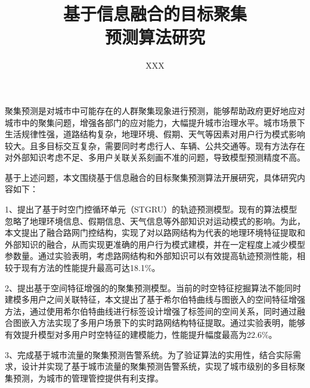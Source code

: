 \documentclass[master]{thesis-uestc}
\title{基于信息融合的目标聚集\\预测算法研究}{Research on Target Gather Prediction Algorithm based on Information Fusion}
\author{XXX}{XXX}
\begin{document}
\makecover
\originalitydeclaration
\begin{chineseabstract}
聚集预测是对城市中可能存在的人群聚集现象进行预测，能够帮助政府更好地应对城市中的聚集问题，增强各部门的应对能力，大幅提升城市治理水平。城市场景下生活规律性强，道路结构复杂，地理环境、假期、天气等因素对用户行为模式影响较大。且多目标交互复杂，需要同时考虑行人、车辆、公共交通等。现有方法存在对外部知识考虑不足、多用户关联关系刻画不准的问题，导致模型预测精度不高。

基于上述问题，本文围绕基于信息融合的目标聚集预测算法开展研究，具体研究内容如下：

1、提出了基于时空门控循环单元（STGRU）的轨迹预测模型。现有的算法模型忽略了地理环境信息、假期信息、天气信息等外部知识对运动模式的影响。为此，本文提出了融合路网门控结构，实现了对以路网结构为代表的地理环境特征提取和外部知识的融合，从而实现更准确的用户行为模式建模，并在一定程度上减少模型参数量。通过实验表明，考虑路网结构和外部知识可以有效提高轨迹预测性能，相较于现有方法的性能提升最高可达18.1$\%$。

2、提出基于空间特征增强的的聚集预测模型。当前的时空特征挖掘算法不能同时建模多用户之间关联特征，本文提出了基于希尔伯特曲线与图嵌入的空间特征增强方法，通过使用希尔伯特曲线进行标签设计增强了标签间的空间关系，同时通过融合图嵌入方法实现了多用户场景下的实时路网结构特征提取。通过实验表明，能够有效提升模型对多用户时空特征的建模能力，性能提升幅度最高为22.6$\%$。

3、完成基于城市流量的聚集预测告警系统。为了验证算法的实用性，结合实际需求，设计并实现了基于城市流量的聚集预测告警系统，实现了城市级别的多目标聚集预测，为城市的管理管控提供有利支撑。

\end{chineseabstract}
\end{document}
